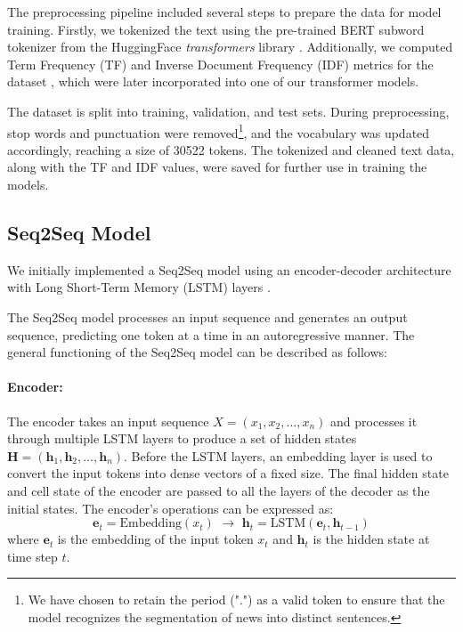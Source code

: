 \documentclass[a4papers, 11pt]{article}
\begin{document}
The preprocessing pipeline included several steps to prepare the data for model training. Firstly, we tokenized the text using the pre-trained BERT subword tokenizer from the HuggingFace \textit{transformers} library \citep{BERTtokenizer}. Additionally, we computed Term Frequency (TF) and Inverse Document Frequency (IDF) metrics for the dataset \citep{nallapati2016abstractive}, which were later incorporated into one of our transformer models. 

The dataset is split into training, validation, and test sets. During preprocessing, stop words and punctuation were removed\footnote{We have chosen to retain the period (".") as a valid token to ensure that the model recognizes the segmentation of news into distinct sentences.}, and the vocabulary was updated accordingly, reaching a size of 30522 tokens. The tokenized and cleaned text data, along with the TF and IDF values, were saved for further use in training the models.

\subsection{Seq2Seq Model}

We initially implemented a Seq2Seq model \citep{sutskever2014sequence} using an encoder-decoder architecture with Long Short-Term Memory (LSTM) layers \citep{lstm}. 

The Seq2Seq model processes an input sequence and generates an output sequence, predicting one token at a time in an autoregressive manner. The general functioning of the Seq2Seq model can be described as follows:

\paragraph{Encoder:}
The encoder takes an input sequence \( X = (x_1, x_2, \ldots, x_n) \) and processes it through multiple LSTM layers to produce a set of hidden states \( \mathbf{H} = (\mathbf{h}_1, \mathbf{h}_2, \ldots, \mathbf{h}_n) \). Before the LSTM layers, an embedding layer is used to convert the input tokens into dense vectors of a fixed size. The final hidden state and cell state of the encoder are passed to all the layers of the decoder as the initial states. The encoder's operations can be expressed as:
\begin{equation}
    \mathbf{e}_t = \text{Embedding}(x_t) \,\, \rightarrow \,\, \mathbf{h}_t = \text{LSTM}(\mathbf{e}_t, \mathbf{h}_{t-1})
\end{equation}
where \( \mathbf{e}_t \) is the embedding of the input token \( x_t \) and \( \mathbf{h}_t \) is the hidden state at time step \( t \).
\end{document}
